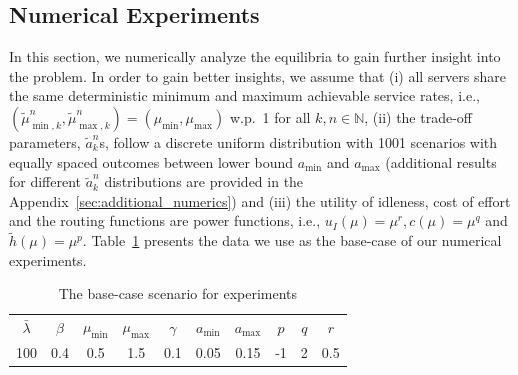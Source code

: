 \documentclass[a4paper,11pt,twoside]{article}
\numberwithin{equation}{section}
\numberwithin{figure}{section}
\theoremstyle{plain}
\newtheorem{assumption}[theorem]{Assumption}
\newcommand{\NN}{\mathbb{N}}
\newcommand{\1}{\mathbbm{1}}
\begin{document}



\subsection{Numerical Experiments}\label{sec:numerical}
 
In this section, we numerically analyze the equilibria to gain further insight into the problem.  In
order to gain better insights, we assume that (i) all servers share the same deterministic  minimum and maximum achievable service rates, i.e., $(\tilde{\mu}_{\min,k}^n,\tilde{\mu}_{\max,k}^n)=(\mu_{\min},\mu_{\max})$ w.p.~1 for all $k, n\in  \NN$, (ii) the trade-off parameters, $\tilde{a}_k^n$s, follow a discrete uniform distribution with 1001 scenarios with equally spaced outcomes between lower bound $a_{\min}$ and $a_{\max}$ (additional results for different $\tilde{a}_k^n$ distributions are provided in the Appendix~\ref{sec:additional_numerics}) and (iii) the utility of idleness, cost of effort and the routing functions are power functions, i.e., $u_I(\mu)=\mu^r, c(\mu)=\mu^{q}$ and $\tilde{h}(\mu)=\mu^p$. Table~\ref{tab:basecase} presents the data we use as the base-case of our numerical experiments.  

\begin{table}[h!tb]
    
    \begin{center}
    \caption{The base-case scenario for experiments}
    \begin{tabular}{cccccccccc}\hline
    $\bar{\lambda}$ &$\beta$ &$\mu_{\min}$ &$\mu_{\max}$ &$\gamma$ &$a_{\min}$ &$a_{\max}$ &$p$ &$q$ &$r$\\
    100 &0.4 &0.5 &1.5 &0.1   &0.05 &0.15 &-1 & 2 &0.5\\\hline
     \end{tabular}
     \label{tab:basecase}
     \end{center}
\end{table}
\end{document}
